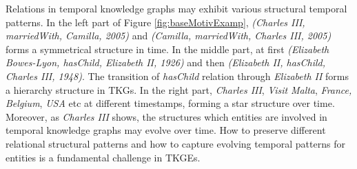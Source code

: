 \documentclass[letterpaper]{article} %
\begin{document}
Relations in temporal knowledge graphs may exhibit various structural temporal patterns. In the left part of Figure \ref{fig:baseMotivExamp}, \textit{(Charles III, marriedWith, Camilla, 2005)} and \textit{(Camilla, marriedWith, Charles III, 2005)} forms a symmetrical structure in time.
In the middle part, at first \textit{(Elizabeth Bowes-Lyon, hasChild, Elizabeth II, 1926)} and then \textit{(Elizabeth II, hasChild, Charles III, 1948)}. The transition of \textit{hasChild} relation through \textit{Elizabeth II} forms a hierarchy structure in TKGs.
In the right part, \textit{Charles III}, \textit{Visit} \textit{Malta}, \textit{France, Belgium}, \textit{USA} etc at different timestamps, forming a star structure over time.
Moreover, as \textit{Charles III} shows, the structures which entities are involved in temporal knowledge graphs may evolve over time.
How to preserve different relational structural patterns and how to capture evolving temporal patterns for entities is a fundamental challenge in TKGEs.
\end{document}
